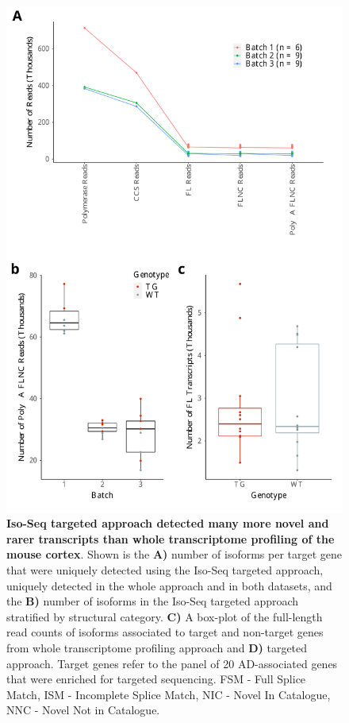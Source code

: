 \begin{figure}[!htp]
	\begin{center}
		\includegraphics[page=3,trim={0 1.5cm 0 0cm},clip,scale = 0.55]{Figures/TargetedTranscriptome.pdf}
	\end{center}
	\captionsetup{width=0.95\textwidth}
	\caption[Comparison of whole transcriptome vs targeted Iso-Seq transcriptome profiling]%
	{\textbf{Iso-Seq targeted approach detected many more novel and rarer transcripts than whole transcriptome profiling of the mouse cortex}. Shown is the \textbf{A)} number of isoforms per target gene that were uniquely detected using the Iso-Seq targeted approach, uniquely detected in the whole approach and in both datasets, and the \textbf{B)} number of isoforms in the Iso-Seq targeted approach stratified by structural category. \textbf{C)} A box-plot of the full-length read counts of isoforms associated to target and non-target genes from whole transcriptome profiling approach and \textbf{D)} targeted approach. Target genes refer to the panel of 20 AD-associated genes that were enriched for targeted sequencing. FSM - Full Splice Match, ISM - Incomplete Splice Match, NIC - Novel In Catalogue, NNC - Novel Not in Catalogue.}
\end{figure}

